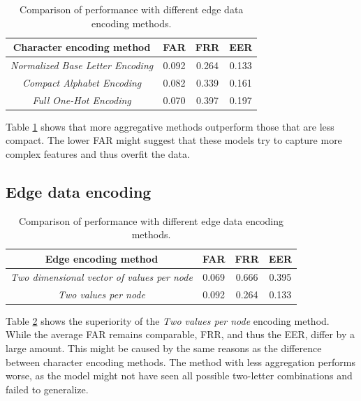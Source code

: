 \begin{center}
	\begin{table}[H]
		\begin{center}
			\begin{tabular}{ |c|c|c|c| } 
				\hline
				Character encoding method & FAR & FRR & EER \\
				\hline
				\textit{Normalized Base Letter Encoding} & 0.092 & 0.264 & 0.133 \\
				\hline
				\textit{Compact Alphabet Encoding} & 0.082 & 0.339 & 0.161 \\
				\hline
				\textit{Full One-Hot Encoding} & 0.070 & 0.397 & 0.197 \\
				\hline
			\end{tabular}
		\end{center}
		\caption{Comparison of performance with different edge data encoding methods.}
		\label{table:char_encoding}
	\end{table}
\end{center}

Table \ref{table:char_encoding} shows that more aggregative methods outperform those that are less compact. The lower FAR might suggest that these models try to capture more complex features and thus overfit the data.

\subsection{Edge data encoding}

\begin{center}
	\begin{table}[H]
		\begin{center}
			\begin{tabular}{ |c|c|c|c| } 
				\hline
				Edge encoding method & FAR & FRR & EER \\
				\hline
				\textit{Two dimensional vector of values per node} & 0.069 & 0.666 & 0.395 \\
				\hline
				\textit{Two values per node} & 0.092 & 0.264 & 0.133 \\
				\hline
			\end{tabular}
		\end{center}
		\caption{Comparison of performance with different edge data encoding methods.}
		\label{table:egde_encoding_comp}
	\end{table}
\end{center}

Table \ref{table:egde_encoding_comp} shows the superiority of the \textit{Two values per node} encoding method. While the average FAR remains comparable, FRR, and thus the EER, differ by a large amount. This might be caused by the same reasons as the difference between character encoding methods. The method with less aggregation performs worse, as the model might not have seen all possible two-letter combinations and failed to generalize.\\


